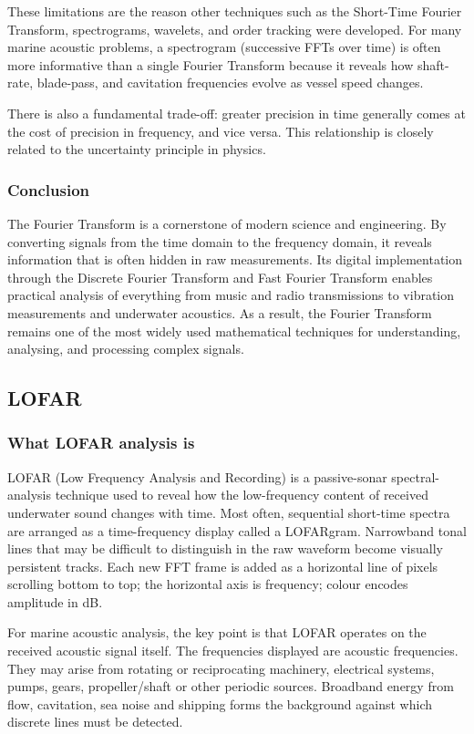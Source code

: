 These limitations are the reason other techniques such as the Short-Time Fourier Transform, spectrograms, wavelets, and order tracking were developed. For many marine acoustic problems, a spectrogram (successive FFTs over time) is often more informative than a single Fourier Transform because it reveals how shaft-rate, blade-pass, and cavitation frequencies evolve as vessel speed changes.

There is also a fundamental trade-off: greater precision in time generally comes at the cost of precision in frequency, and vice versa. This relationship is closely related to the uncertainty principle in physics.

\subsubsection{Conclusion}
The Fourier Transform is a cornerstone of modern science and engineering. By converting signals from the time domain to the frequency domain, it reveals information that is often hidden in raw measurements. Its digital implementation through the Discrete Fourier Transform and Fast Fourier Transform enables practical analysis of everything from music and radio transmissions to vibration measurements and underwater acoustics. As a result, the Fourier Transform remains one of the most widely used mathematical techniques for understanding, analysing, and processing complex signals.

\subsection{LOFAR}

\subsubsection{What LOFAR analysis is}

LOFAR (Low Frequency Analysis and Recording) is a passive-sonar spectral-analysis technique used to reveal how the low-frequency content of received underwater sound changes with time. Most often, sequential short-time spectra are arranged as a time-frequency display called a LOFARgram. Narrowband tonal lines that may be difficult to distinguish in the raw waveform become visually persistent tracks. Each new FFT frame is added as a horizontal line of pixels scrolling bottom to top; the horizontal axis is frequency; colour encodes amplitude in dB.

For marine acoustic analysis, the key point is that LOFAR operates on the received acoustic signal itself. The frequencies displayed are acoustic frequencies. They may arise from rotating or reciprocating machinery, electrical systems, pumps, gears, propeller/shaft or other periodic sources. Broadband energy from flow, cavitation, sea noise and shipping forms the background against which discrete lines must be detected.

